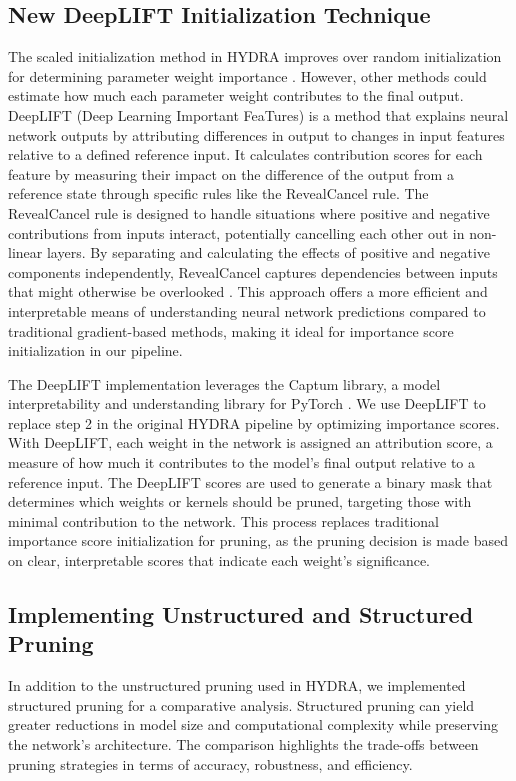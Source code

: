 \documentclass[10pt]{cai}
\begin{document}
\subsection{New DeepLIFT Initialization Technique}
The scaled initialization method in HYDRA improves over random initialization for determining parameter weight importance \cite{hydra}. However, other methods could estimate how much each parameter weight contributes to the final output. DeepLIFT (Deep Learning Important FeaTures) \cite{deeplift} is a method that explains neural network outputs by attributing differences in output to changes in input features relative to a defined reference input. It calculates contribution scores for each feature by measuring their impact on the difference of the output from a reference state through specific rules like the RevealCancel rule. The RevealCancel rule is designed to handle situations where positive and negative contributions from inputs interact, potentially cancelling each other out in non-linear layers. By separating and calculating the effects of positive and negative components independently, RevealCancel captures dependencies between inputs that might otherwise be overlooked \cite{deeplift}. This approach offers a more efficient and interpretable means of understanding neural network predictions compared to traditional gradient-based methods, making it ideal for importance score initialization in our pipeline.

The DeepLIFT implementation leverages the Captum library, a model interpretability and understanding library for PyTorch \cite{captum}. We use DeepLIFT to replace step 2 in the original HYDRA pipeline by optimizing importance scores. With DeepLIFT, each weight in the network is assigned an attribution score, a measure of how much it contributes to the model’s final output relative to a reference input. The DeepLIFT scores are used to generate a binary mask that determines which weights or kernels should be pruned, targeting those with minimal contribution to the network. This process replaces traditional importance score initialization for pruning, as the pruning decision is made based on clear, interpretable scores that indicate each weight’s significance.

\subsection{Implementing Unstructured and Structured Pruning}
In addition to the unstructured pruning used in HYDRA, we implemented structured pruning for a comparative analysis. Structured pruning can yield greater reductions in model size and computational complexity while preserving the network's architecture. The comparison highlights the trade-offs between pruning strategies in terms of accuracy, robustness, and efficiency.
\end{document}
